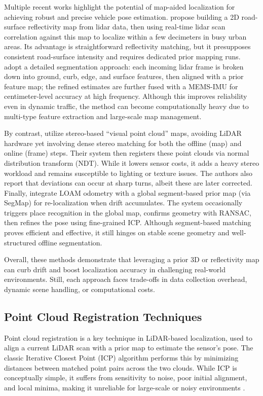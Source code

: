 Multiple recent works highlight the potential of map-aided localization for achieving robust and precise vehicle pose estimation.\cite{Levinson2007MapBased} propose building a 2D road-surface reflectivity map from lidar data, then using real-time lidar scan correlation against this map to localize within a few decimeters in busy urban areas. Its advantage is straightforward reflectivity matching, but it presupposes consistent road-surface intensity and requires dedicated prior mapping runs.\cite{liu2019segmentation} adopt a detailed segmentation approach: each incoming lidar frame is broken down into ground, curb, edge, and surface features, then aligned with a prior feature map; the refined estimates are further fused with a MEMS-IMU for centimeter-level accuracy at high frequency. Although this improves reliability even in dynamic traffic, the method can become computationally heavy due to multi-type feature extraction and large-scale map management.

By contrast,\cite{Lin2021Autonomous} utilize stereo-based “visual point cloud” maps, avoiding LiDAR hardware yet involving dense stereo matching for both the offline (map) and online (frame) steps. Their system then registers these point clouds via normal distribution transform (NDT). While it lowers sensor costs, it adds a heavy stereo workload and remains susceptible to lighting or texture issues. The authors also report that deviations can occur at sharp turns, albeit these are later corrected. Finally, \cite{Rozenberszki2020LOL} integrate LOAM odometry with a global segment-based prior map (via SegMap) for re-localization when drift accumulates. The system occasionally triggers place recognition in the global map, confirms geometry with RANSAC, then refines the pose using fine-grained ICP. Although segment-based matching proves efficient and effective, it still hinges on stable scene geometry and well-structured offline segmentation.

Overall, these methods demonstrate that leveraging a prior 3D or reflectivity map can curb drift and boost localization accuracy in challenging real-world environments. Still, each approach faces trade-offs in data collection overhead, dynamic scene handling, or computational costs.

\subsection{Point Cloud Registration Techniques}
Point cloud registration is a key technique in LiDAR-based localization, used to align a current LiDAR scan with a prior map to estimate the sensor’s pose. The classic Iterative Closest Point (ICP) algorithm performs this by minimizing distances between matched point pairs across the two clouds. While ICP is conceptually simple, it suffers from sensitivity to noise, poor initial alignment, and local minima, making it unreliable for large-scale or noisy environments \cite{BeslICP1992}.\\


